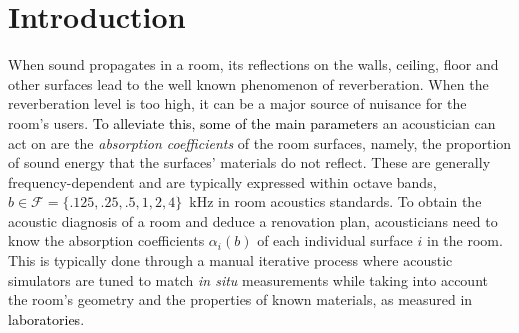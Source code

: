 \documentclass[reprint]{JASA}
\makeatletter
\newif\ifnotes
\newcommand{\note}[1]{\@bsphack\ifnotes{#1}\fi\@esphack}
\makeatother
\begin{document}
\section{\label{sec:intro} Introduction}
When sound propagates in a room, its reflections on the walls, ceiling, floor and other surfaces lead to the well known phenomenon of reverberation. When the reverberation level is too high, it can be a major source of nuisance for the room's users.
\note{\sout{To improve the listening quality of a room, the main parameters}}
\textcolor{black}{To alleviate this, some of the main parameters} an acoustician can act on are the \textit{absorption coefficients} of the room surfaces, namely, the proportion of sound energy that the surfaces' materials do not reflect. These are generally frequency-dependent and are typically expressed within octave bands, $b\in\mathcal{F}=\{.125,.25,.5,1,2,4\}$~kHz in room acoustics standards. To obtain the acoustic diagnosis of a room and deduce a renovation plan, acousticians need to know the absorption coefficients $\alpha_i(b)$ of each individual surface $i$ in the room. This is typically done through a manual iterative process where acoustic simulators are tuned to match \textit{in situ} measurements while taking into account the room's geometry and the properties of known materials, as measured in \textcolor{black}{laboratories}.
\end{document}
